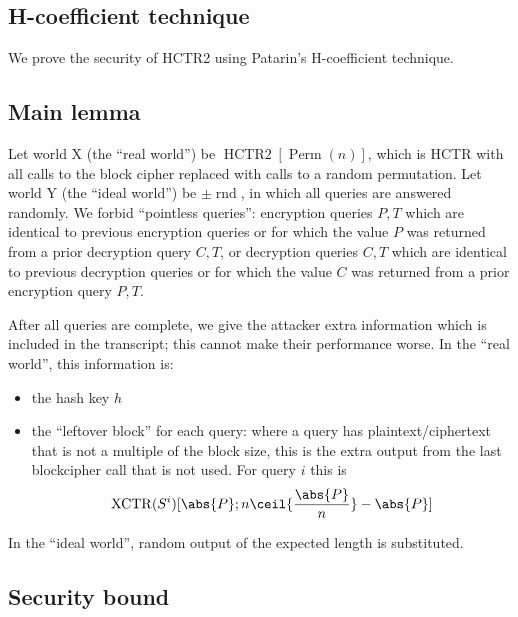 \documentclass[letterpaper,11pt]{article}
\DeclareMathOperator{\HCTR}{HCTR2}
\DeclareMathOperator{\Perm}{Perm}
\DeclareMathOperator{\rnd}{rnd}
\DeclareMathOperator{\XCTR}{XCTR}
\begin{document}
\subsection{H-coefficient technique}

We prove the security of HCTR2 using Patarin's H-coefficient technique. 

\subsection{Main lemma} 
Let world X (the ``real world'') be \(\HCTR[\Perm(n)]\),
which is HCTR with all calls to the block cipher
replaced with calls to a random permutation.
Let world Y (the ``ideal world'') be \(\pm\rnd\),
in which all queries are answered randomly.
We forbid ``pointless queries'':
encryption queries \(P, T\)
which are identical to previous encryption queries
or for which the value \(P\) was returned from a prior
decryption  query \(C, T\), or
decryption queries \(C, T\)
which are identical to previous decryption queries
or for which the value \(C\) was returned from a prior
encryption  query \(P, T\).

After all queries are complete, we give the attacker
extra information
which is included in the transcript;
this cannot make
their performance worse. In the ``real world'', 
this information is:
\begin{itemize}
    \item the hash key \(h\)
    \item the ``leftover block'' for each query:
    where a query has plaintext/ciphertext
    that is not a multiple of the block size,
    this is the extra output from the last
    blockcipher call that is not used.
    For query \(i\) this is 
    \[\XCTR(S^i)[\abs{P}; n\ceil{\frac{\abs{P}}{n}}-\abs{P}]\]
\end{itemize}
In the ``ideal world'', random output of the expected
length is substituted.

\subsection{Security bound}

\printbibliography[heading=bibintoc]
\end{document}
